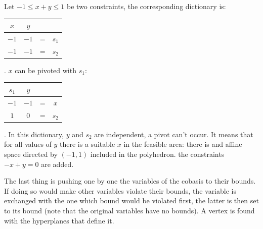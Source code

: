 \begin{example} 
\begin{multicols}{2}
Let $-1\leq x+y\leq 1$ be two constraints, the corresponding dictionary is:
\begin{tabular}{| c | c || c c |}
\hline	
$x$ & $y$ & & \\
\hline
\hline	
$-1$ & $-1$ & = & $s_1$\\ \hline	
$-1$ & $-1$ & = & $s_2$\\ \hline 
\end{tabular}. $x$ can be pivoted with $s_1$:
\begin{tabular}{| c | c || c c |}
\hline	
$s_1$ & $y$ & & \\
\hline
\hline	
$-1$ & $-1$ & = & $x$\\ \hline	
$1$ & $0$ & = & $s_2$\\ \hline 
\end{tabular}. In this dictionary, $y$ and $s_2$ are independent, a pivot can't occur. It means that for all values of $y$ there is a suitable $x$ in the feasible area: there is and affine space directed by $(-1,1)$ included in the polyhedron. the constraints $-x+y=0$ are added.

\columnbreak

\end{multicols}
\label{ex_detect_linalty}
\end{example}

The last thing is pushing one by one the variables of the cobasis to their bounds. If doing so would make other variables violate their bounds, the variable is exchanged with the one which bound would be violated first, the latter is then set to its bound (note that the original variables have no bounds). A vertex is found with the hyperplanes that define it.

